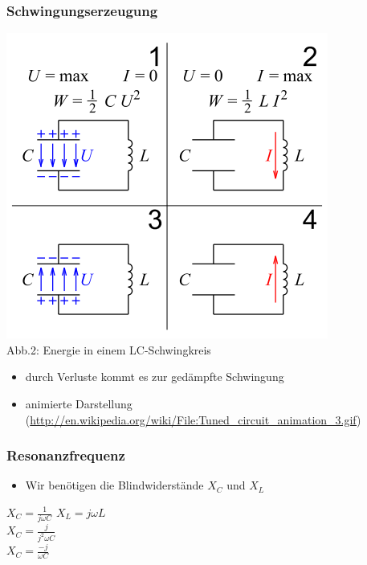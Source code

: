 \begin{frame}
\frametitle{Schwingungserzeugung}
\begin{center}
	\includegraphics[scale=0.35]{a04/Schwingkreis.png}\\
	Abb.2: Energie in einem LC-Schwingkreis \cite{wmde} \\
	\vspace{3mm}
	\begin{itemize}
		\item durch Verluste kommt es zur gedämpfte Schwingung\\
		\item animierte Darstellung (\url{http://en.wikipedia.org/wiki/File:Tuned_circuit_animation_3.gif})
	\end{itemize}
\end{center}
\end{frame}

\begin{frame}
\frametitle{Resonanzfrequenz}
	\begin{itemize}
		\item Wir benötigen die Blindwiderstände $X_C$ und $X_L$
	\end{itemize}

	\begin{LARGE}
		$X_C = \frac{1}{j \omega C}$ 
		\hspace{3cm}
		$X_L = j \omega L$ \\
		\vspace{1cm}
		$X_C = \frac{j}{j^2 \omega C}$ \\
		\vspace{1cm}
		$X_C = \frac{-j}{\omega C}$ \\
	\end{LARGE}
\end{frame}

